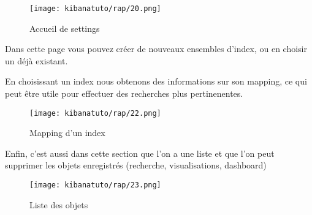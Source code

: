 \begin{figure}[H]
\center
\texttt{[image: kibanatuto/rap/20.png]}
\label{fig:kibanatuto13}
\caption{Accueil de settings}
\end{figure}

Dans cette page vous pouvez créer de nouveaux ensembles d'index, ou en choisir un 
déjà existant.

En choisissant un index nous obtenons des informations sur son mapping, ce qui peut 
être utile pour effectuer des recherches plus pertinenentes.


\begin{figure}[H]
\center
\texttt{[image: kibanatuto/rap/22.png]}
\label{fig:kibanatuto14}
\caption{Mapping d'un index}
\end{figure}

Enfin, c'est aussi dans cette section que l'on a une liste et que l'on peut supprimer les 
objets enregistrés (recherche, visualisations, dashboard)

\begin{figure}[H]
\center
\texttt{[image: kibanatuto/rap/23.png]}
\label{fig:kibanatuto15}
\caption{Liste des objets}
\end{figure}

